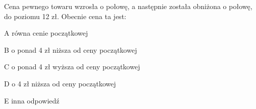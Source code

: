 \begin{tresc}
Cena pewnego towaru wzrosła o połowę, a następnie została obniżona o połowę, do poziomu 12 zł. Obecnie cena ta jest:
\end{tresc}
\begin{wariant}{A} równa cenie początkowej \end{wariant}
\begin{wariant}{B} o ponad 4 zł niższa od ceny początkowej \end{wariant}
\begin{wariant}{C} o ponad 4 zł wyższa od ceny początkowej \end{wariant}
\begin{wariant}{D} o 4 zł niższa od ceny początkowej \end{wariant}
\begin{wariant}{E} inna odpowiedź \end{wariant}
